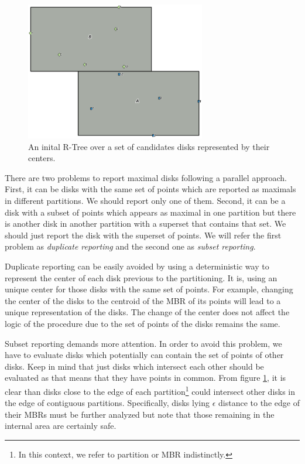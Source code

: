 \documentclass[12pt]{scrartcl}
\begin{document}
\begin{figure}
  \centering
  \includegraphics[width=0.7\textwidth]{./Figures/r-tree}
  \caption{An inital R-Tree over a set of candidates disks represented by their centers.}
  \label{fig:r-tree}
\end{figure}

There are two problems to report maximal disks following a parallel approach. First, it can be disks with the same set of points which are reported as maximals in different partitions.  We should report only one of them.  Second, it can be a disk with a subset of points which appears as maximal in one partition but there is another disk in another partition with a superset that contains that set.   We should just report the disk with the superset of points.  We will refer the first problem as \textit{duplicate reporting} and the second one as \textit{subset reporting}.  

Duplicate reporting can be easily avoided by using a deterministic way to represent the center of each disk previous to the partitioning.  It is, using an unique center for those disks with the same set of points.  For example, changing the center of the disks to the centroid of the MBR of its points will lead to a unique representation of the disks.  The change of the center does not affect the logic of the procedure due to the set of points of the disks remains the same.

Subset reporting demands more attention.  In order to avoid this problem, we have to evaluate disks which potentially can contain the set of points of other disks.  Keep in mind that just disks which intersect each other should be evaluated as that means that they have points in common. From figure \ref{fig:r-tree}, it is clear than disks close to the edge of each partition\footnote{In this context, we refer to partition or MBR indistinctly.} could intersect other disks in the edge of contiguous partitions. Specifically, disks lying $\epsilon$ distance to the edge of their MBRs must be further analyzed but note that those remaining in the internal area are certainly safe. 
\end{document}
